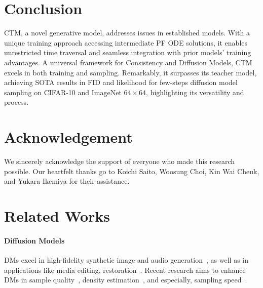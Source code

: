 \documentclass{article} \usepackage{iclr2024_coNFErence,times}
\theoremstyle{definition}
\theoremstyle{remark}
\begin{document}
\section{Conclusion}

CTM, a novel generative model, addresses issues in established models. With a unique training approach accessing intermediate PF ODE solutions, it enables unrestricted time traversal and seamless integration with prior models' training advantages. A universal framework for Consistency and Diffusion Models, CTM excels in both training and sampling. Remarkably, it surpasses its teacher model, achieving SOTA results in FID and likelihood for few-steps diffusion model sampling on CIFAR-10 and ImageNet $64\times64$, highlighting its versatility and process.



\section*{Acknowledgement}
We sincerely acknowledge the support of everyone who made this research possible. Our heartfelt thanks go to Koichi Saito, Woosung Choi, Kin Wai Cheuk, and Yukara Ikemiya for their assistance. 


\clearpage
\newpage











\clearpage
\newpage
\appendix

\tableofcontents
	\newpage
	\parttoc

\section{Related Works}\label{sec:related_work}
\paragraph{Diffusion Models} DMs excel in high-fidelity synthetic image and audio generation~\citep{dhariwal2021diffusion,saharia2022photorealistic,rombach2022high}, as well as in applications like media editing, restoration~\citep{meng2021sdedit,cheuk2023diffroll,kawar2022denoising,saito2023unsupervised,hernandez2023vrdmg,murata2023gibbsddrm}. Recent research aims to enhance DMs in sample quality~\citep{kim2022maximum,kim2022refining}, density estimation~\citep{song2021maximum,lu2022maximum}, and especially, sampling speed~\citep{song2020denoising}. 
\end{document}
